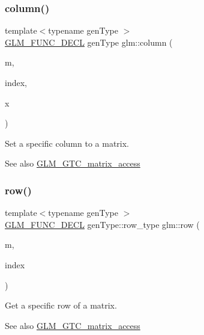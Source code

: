 \subsubsection{\texorpdfstring{column()}{column()}\hspace{0.1cm}{\footnotesize\ttfamily [2/2]}}
{\footnotesize\ttfamily template$<$typename gen\+Type $>$ \\
\hyperlink{setup_8hpp_ab2d052de21a70539923e9bcbf6e83a51}{G\+L\+M\+\_\+\+F\+U\+N\+C\+\_\+\+D\+E\+CL} gen\+Type glm\+::column (\begin{DoxyParamCaption}\item[{gen\+Type const \&}]{m,  }\item[{\hyperlink{namespaceglm_a090a0de2260835bee80e71a702492ed9}{length\+\_\+t}}]{index,  }\item[{typename gen\+Type\+::col\+\_\+type const \&}]{x }\end{DoxyParamCaption})}

Set a specific column to a matrix. \begin{DoxySeeAlso}{See also}
\hyperlink{group__gtc__matrix__access}{G\+L\+M\+\_\+\+G\+T\+C\+\_\+matrix\+\_\+access} 
\end{DoxySeeAlso}
\mbox{\label{group__gtc__matrix__access_ga259e5ebd0f31ec3f83440f8cae7f5dba}} 
\subsubsection{\texorpdfstring{row()}{row()}\hspace{0.1cm}{\footnotesize\ttfamily [1/2]}}
{\footnotesize\ttfamily template$<$typename gen\+Type $>$ \\
\hyperlink{setup_8hpp_ab2d052de21a70539923e9bcbf6e83a51}{G\+L\+M\+\_\+\+F\+U\+N\+C\+\_\+\+D\+E\+CL} gen\+Type\+::row\+\_\+type glm\+::row (\begin{DoxyParamCaption}\item[{gen\+Type const \&}]{m,  }\item[{\hyperlink{namespaceglm_a090a0de2260835bee80e71a702492ed9}{length\+\_\+t}}]{index }\end{DoxyParamCaption})}

Get a specific row of a matrix. \begin{DoxySeeAlso}{See also}
\hyperlink{group__gtc__matrix__access}{G\+L\+M\+\_\+\+G\+T\+C\+\_\+matrix\+\_\+access} 
\end{DoxySeeAlso}
\mbox{\label{group__gtc__matrix__access_gaadcc64829aadf4103477679e48c7594f}} 

